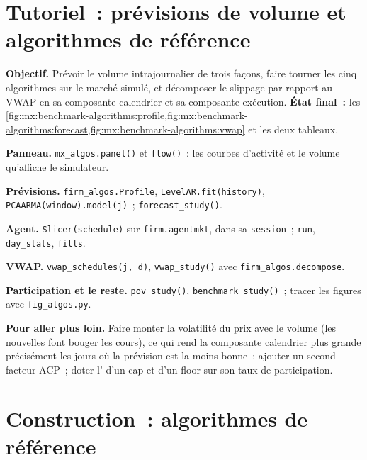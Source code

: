 \section{Tutoriel~: prévisions de volume et algorithmes de référence}\label{tut:mx:benchmark-algorithms:tut}

\begin{tutorial}
\textbf{Objectif.} Prévoir le volume intrajournalier de trois façons, faire tourner les cinq algorithmes sur le marché simulé, et décomposer le slippage par rapport au VWAP en sa
composante calendrier et sa composante exécution.
\textbf{État final~:} les \cref{fig:mx:benchmark-algorithms:profile,fig:mx:benchmark-algorithms:forecast,fig:mx:benchmark-algorithms:vwap} et les deux tableaux.
\begin{tutsteps}
\item \textbf{Panneau.} \texttt{mx\_algos.panel()} et \texttt{flow()}~: les courbes d'activité et le volume qu'affiche le simulateur.
\item \textbf{Prévisions.} \texttt{firm\_algos.Profile}, \texttt{LevelAR.fit(history)}, \texttt{PCAARMA(window).model(j)}~; \texttt{forecast\_study()}.
\item \textbf{Agent.} \texttt{Slicer(schedule)} sur \texttt{firm.agentmkt}, dans sa \texttt{session}~; \texttt{run}, \texttt{day\_stats}, \texttt{fills}.
\item \textbf{VWAP.} \texttt{vwap\_schedules(j, d)}, \texttt{vwap\_study()} avec \texttt{firm\_algos.decompose}.
\item \textbf{Participation et le reste.} \texttt{pov\_study()}, \texttt{benchmark\_study()}~; tracer les figures avec \texttt{fig\_algos.py}.
\end{tutsteps}
\textbf{Pour aller plus loin.} Faire monter la volatilité du prix avec le volume (les nouvelles font bouger les cours), ce qui rend la composante calendrier plus
grande précisément les jours où la prévision est la moins bonne~; ajouter un second facteur ACP~; doter l' d'un cap et d'un floor sur son taux de participation.
\end{tutorial}

\section{Construction~: algorithmes de référence}\label{bld:mx:benchmark-algorithms:algos}

